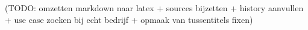 \chapter{}%
\label{ch:stand-van-zaken}

(TODO: omzetten markdown naar latex + sources bijzetten + history aanvullen + use case zoeken bij echt bedrijf + opmaak van tussentitels fixen)
